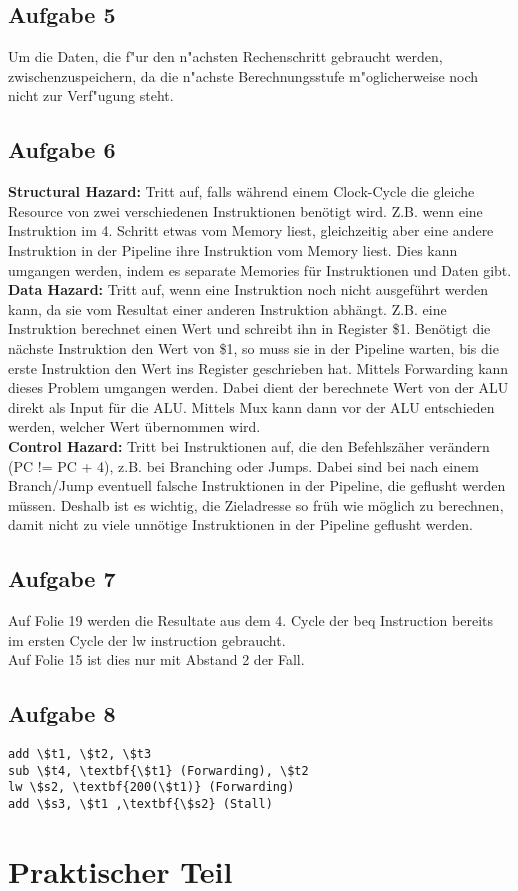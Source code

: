 \documentclass[a4paper,abstracton]{scrartcl}
\begin{document}
\subsection{Aufgabe 5}
Um die Daten, die f"ur den n"achsten Rechenschritt gebraucht werden, zwischenzuspeichern, da die 
n"achste Berechnungsstufe m"oglicherweise noch nicht zur Verf"ugung steht.
\subsection{Aufgabe 6}
\textbf{Structural Hazard:} Tritt auf, falls während einem Clock-Cycle die gleiche Resource von zwei verschiedenen Instruktionen benötigt wird. Z.B. wenn eine Instruktion im 4. Schritt etwas vom Memory liest, gleichzeitig aber eine andere Instruktion in der Pipeline ihre Instruktion vom Memory liest. Dies kann umgangen werden, indem es separate Memories für Instruktionen und Daten gibt.\\
\textbf{Data Hazard:} Tritt auf, wenn eine Instruktion noch nicht ausgeführt werden kann, da sie vom Resultat einer anderen Instruktion abhängt. Z.B. eine Instruktion berechnet einen Wert und schreibt ihn in Register \$1. Benötigt die nächste Instruktion den Wert von \$1, so muss sie in der Pipeline warten, bis die erste Instruktion den Wert ins Register geschrieben hat. Mittels Forwarding kann dieses Problem umgangen werden. Dabei dient der berechnete Wert von der ALU direkt als Input für die ALU. Mittels Mux kann dann vor der ALU entschieden werden, welcher Wert übernommen wird. \\
\textbf{Control Hazard:} Tritt bei Instruktionen auf, die den Befehlszäher verändern (PC != PC + 4), z.B. bei Branching oder Jumps. Dabei sind bei nach einem Branch/Jump eventuell falsche Instruktionen in der Pipeline, die geflusht werden müssen. Deshalb ist es wichtig, die Zieladresse so früh wie möglich zu berechnen, damit nicht zu viele unnötige Instruktionen in der Pipeline geflusht werden.\\
\subsection{Aufgabe 7}
Auf Folie 19 werden die Resultate aus dem 4. Cycle der beq Instruction bereits im ersten Cycle der lw instruction gebraucht.\\
Auf Folie 15 ist dies nur mit Abstand 2 der Fall.
\subsection{Aufgabe 8}
\begin{lstlisting}
add \$t1, \$t2, \$t3
sub \$t4, \textbf{\$t1} (Forwarding), \$t2
lw \$s2, \textbf{200(\$t1)} (Forwarding)
add \$s3, \$t1 ,\textbf{\$s2} (Stall)
\end{lstlisting}

\newpage
\section{Praktischer Teil}

\newpage

\end{document}
